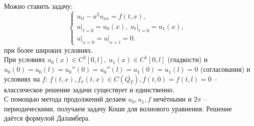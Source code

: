 \documentclass[../main.tex]{subfiles}
\begin{document}
Можно ставить задачу:
\begin{equation*}
	\begin{cases}
	u_{tt} - a^2u_{xx} = f(t, x), \\
	u\bigr|_{t = 0} = u_0(x), \; u_t\bigr|_{t = 0} = u_1(x), \\
	u\bigr|_{x = 0} = u\bigr|_{x = l} = 0.
	\end{cases}
\end{equation*}
при более широких условиях. \\
При условиях $u_0(x) \in C^2[0, l], \; u_1(x) \in C^1[0, l]$ (гладкости) и $u_0(0) = u_0(l) = u_0''(0) = u_0''(l) = u_1(0) = u_1(l) = 0$ (согласования) и условиях на $f$: $f(t, x), f_x(t, x) \in C(\overline{Q_T}), f(t, 0) = f(t, l) = 0$ -- классическое решение задачи существует и единственно. \\
С помощью метода продолжений делаем $u_0, u_1, f$ нечётными и $2 \pi$ -- периодическими, получаем задачу Коши для волнового уравнения. Решение даётся формулой Даламбера.
\end{document}
